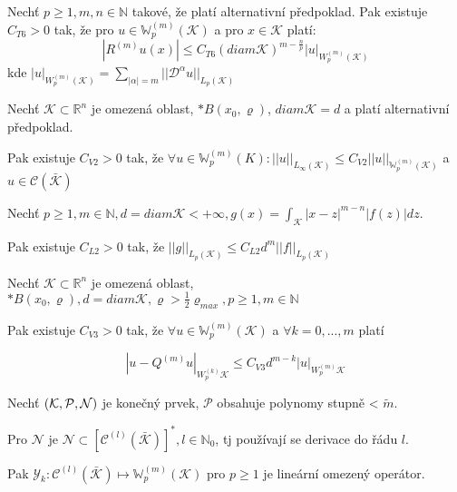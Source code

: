 \documentclass[../main.tex]{subfiles}
\begin{document}
\begin{claim}[T6]
    Nechť $p\geq1, m,n\in\mathbb{N}$ takové, že platí alternativní předpoklad. Pak existuje $C_{T6} > 0$ tak, že pro 
    $u\in \mathbb{W}_p^{(m)}(\mathcal{K})$ a pro $x\in\mathcal{K}$ platí:
    \begin{equation*}
        \left| R^{(m)} u(x) \right| \leq C_{T6} (diam \mathcal{K})^{m-\frac{n}{p}} |u|_{W_p^{(m)}(\mathcal{K})}
    \end{equation*}
    kde $|u|_{W^{(m)}_p (\mathcal{K})} = \sum_{|\alpha| =  m} ||\mathcal{D}^\alpha u || _{L_p (\mathcal{K})}$
\end{claim}


\begin{theorem}
    Nechť $\mathcal{K} \subset \mathbb{R}^n$ je omezená oblast, $*B(x_0, \varrho)$, $diam \mathcal{K} = d$ a platí alternativní předpoklad.

    Pak existuje $C_{V2} > 0$ tak, že $\forall u \in \mathbb{W}_p^{(m)} (K) : ||u||_{L_\infty(\mathcal{K})} \leq C_{V2} ||u||_{\mathbb{W}_p^{(m)}(\mathcal{K})} $ a $u\in\mathcal{C}(\bar{\mathcal{K}})$
    
\end{theorem}



\begin{lemma}
    Nechť $p\geq 1, m\in\mathbb{N}, d = diam \mathcal{K} < +\infty, g(x) = \int_\mathcal{K} |x-z|^{m-n} |f(z)| dz$.\

    Pak existuje $C_{L2} > 0$ tak, že $||g||_{L_p(\mathcal{K})} \leq C_{L2} d^m ||f||_{L_p(\mathcal{K})}$
\end{lemma}


\begin{theorem}
    Nechť $\mathcal{K}\subset\mathbb{R}^n$ je omezená oblast, $*B(x_0,\varrho), d=diam\mathcal{K}, \varrho > \frac{1}{2} \varrho_{max}, p\geq 1, m\in \mathbb{N} $
    
    Pak existuje $C_{V3} > 0$ tak, že $\forall u \in \mathbb{W}_p^{(m)}(\mathcal{K})$ a $\forall k = 0,...,m$ platí

    \begin{equation*}
        \left|  u-Q^{(m)}u     \right|_{W_p^{(k)}\mathcal{K}} \leq C_{V3} d^{m-k} |u|_{W_p^{(m)}\mathcal{K}} 
    \end{equation*}


\end{theorem}


\begin{lemma}[L3]
    Nechť $(\mathcal{K}, \mathcal{P}, \mathcal{N})$ je konečný prvek, $\mathcal{P}$ obsahuje polynomy stupně < $\tilde{m}$.

    Pro $\mathcal{N}$ je $\mathcal{N}\subset \left[ \mathcal{C}^{(l)} (\bar{\mathcal{K}})  \right]^*, l\in \mathbb{N}_0$, tj používají se derivace do řádu $l$.


    Pak $\mathcal{Y}_k : \mathcal{C}^{(l)}(\bar{\mathcal{K}}) \mapsto \mathbb{W}_p^{(m)}(\mathcal{K})$ pro $p\geq1$ je lineární omezený operátor. 
\end{lemma}
\end{document}
